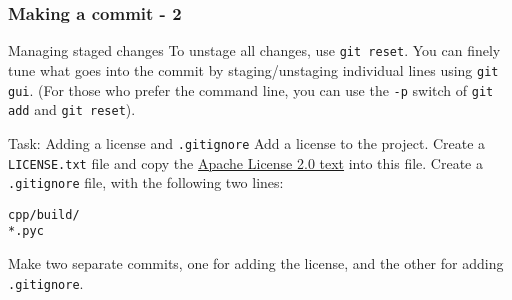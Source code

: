 
\begin{frame}[fragile]

\frametitle{Making a commit - 2}

\begin{block}{Managing staged changes}
	To unstage all changes, use \texttt{git reset}. You can finely tune what goes into the commit by staging/unstaging individual lines using \texttt{git gui}. (For those who prefer the command line, you can use the \texttt{-p} switch of \texttt{git add} and \texttt{git reset}).
\end{block}

\begin{block}{Task: Adding a license and \texttt{.gitignore}}
	Add a license to the project. Create a \texttt{LICENSE.txt} file and copy the \href{https://choosealicense.com/licenses/apache-2.0/}{Apache License 2.0 text} into this file. Create a \texttt{.gitignore} file, with the following two lines:
	\begin{verbatim}
cpp/build/
*.pyc
	\end{verbatim}
Make two separate commits, one for adding the license, and the other for adding \texttt{.gitignore}.
\end{block}
	
\end{frame}


